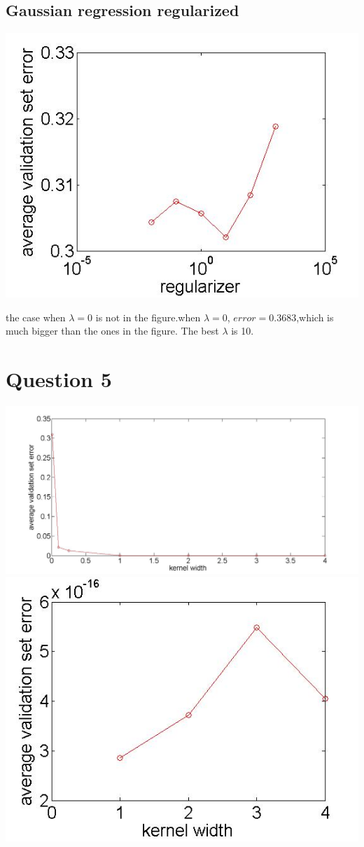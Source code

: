 \documentclass[paper=a4, fontsize=11pt]{article} %
\begin{document}
\subsection{Gaussian regression regularized}
\includegraphics[width=\linewidth]{gaussian_reg_reg.jpg}

the case when $\lambda=0$ is not in the figure.when $\lambda=0$, $error = 0.3683$,which is much bigger than the ones in the figure.
The best $\lambda$ is 10.

\section{Question 5}
\includegraphics[width=\linewidth]{nadaray.jpg}
\includegraphics[width=\linewidth]{nadaray2.jpg}
\end{document}
